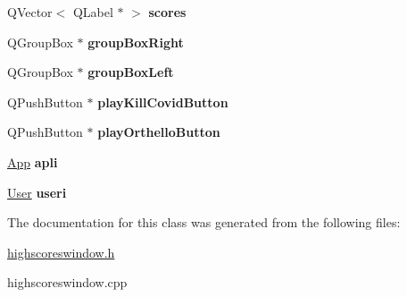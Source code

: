 \begin{DoxyCompactItemize}
\item 
\mbox{\label{classhighscoresWindow_a57ded0f789ac4e8b6de2b1c8122422ef}} 
Q\+Vector$<$ Q\+Label $\ast$ $>$ {\bfseries scores}
\item 
\mbox{\label{classhighscoresWindow_a8a30ab4c9b9d4114fb528c56c0c25d66}} 
Q\+Group\+Box $\ast$ {\bfseries group\+Box\+Right}
\item 
\mbox{\label{classhighscoresWindow_abd5a2b03d2af91fc16c1b27ecfbd617e}} 
Q\+Group\+Box $\ast$ {\bfseries group\+Box\+Left}
\item 
\mbox{\label{classhighscoresWindow_a3a793c0d32d116c76b22eeec89d3a524}} 
Q\+Push\+Button $\ast$ {\bfseries play\+Kill\+Covid\+Button}
\item 
\mbox{\label{classhighscoresWindow_a9fc09f28e1be2c5f76b1dc8f2e932c04}} 
Q\+Push\+Button $\ast$ {\bfseries play\+Orthello\+Button}
\item 
\mbox{\label{classhighscoresWindow_ab8397529305f7a33a1ddf0cc90a7f647}} 
\hyperlink{classApp}{App} {\bfseries apli}
\item 
\mbox{\label{classhighscoresWindow_a42c3038885ae2f86079aea7e7eb306b0}} 
\hyperlink{classUser}{User} {\bfseries useri}
\end{DoxyCompactItemize}


The documentation for this class was generated from the following files\+:\begin{DoxyCompactItemize}
\item 
\hyperlink{highscoreswindow_8h}{highscoreswindow.\+h}\item 
highscoreswindow.\+cpp\end{DoxyCompactItemize}
